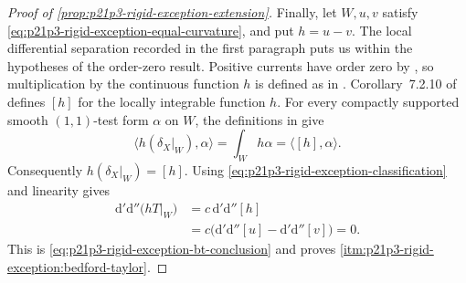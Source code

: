 \begin{proof}[Proof of
\cref{prop:p21p3-rigid-exception-extension}]
Finally, let $W,u,v$ satisfy
\eqref{eq:p21p3-rigid-exception-equal-curvature}, and put $h=u-v$.
The local differential separation recorded in the first paragraph puts us
within the hypotheses of the order-zero result.  Positive currents have
order zero by
\cite[Proposition~7.2.9]{CLD25}, so multiplication by the continuous
function $h$ is defined as in \cite[Example~7.2.12]{CLD25}.  Corollary~7.2.10
of \cite{CLD25} defines $[h]$ for the locally integrable function $h$.  For
every compactly supported smooth $(1,1)$-test form $\alpha$ on $W$, the
definitions in \cite[Corollary~7.2.10, Example~7.2.12, and
\S7.3.1]{CLD25} give
\[
 \bigl\langle h(\delta_X|_W),\alpha\bigr\rangle
 =\int_W h\alpha
 =\langle[h],\alpha\rangle.
\]
Consequently $h(\delta_X|_W)=[h]$.  Using
\eqref{eq:p21p3-rigid-exception-classification} and linearity gives
\begin{align*}
 \mathrm d'\mathrm d''\bigl(hT|_W\bigr)
 &=c\,\mathrm d'\mathrm d''[h]\\
 &=c\bigl(\mathrm d'\mathrm d''[u]
          -\mathrm d'\mathrm d''[v]\bigr)=0.
\end{align*}
This is \eqref{eq:p21p3-rigid-exception-bt-conclusion} and proves
\cref{itm:p21p3-rigid-exception:bedford-taylor}.
\end{proof}

